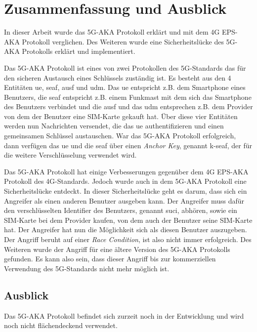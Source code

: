\chapter{Zusammenfassung und Ausblick}
\label{chap:6}

In dieser Arbeit wurde das 5G-AKA Protokoll erklärt und mit dem 4G EPS-AKA Protokoll verglichen.
Des Weiteren wurde eine Sicherheitslücke des 5G-AKA Protokolls erklärt und implementiert.

Das 5G-AKA Protokoll ist eines von zwei Protokollen des 5G-Standards das für den sicheren Austausch eines Schlüssels zuständig ist.
Es besteht aus den 4 Entitäten \gls{ue}, \gls{seaf}, \gls{ausf} und \gls{udm}.
Das \gls{ue} entspricht z.B. dem Smartphone eines Benutzers, die \gls{seaf} entspricht z.B. einem Funkmast mit dem sich das Smartphone des Benutzers verbindet und die \gls{ausf} und das \gls{udm} entsprechen z.B. dem Provider von dem der Benutzer eine SIM-Karte gekauft hat.
Über diese vier Entitäten werden nun Nachrichten versendet, die das \gls{ue} authentifizieren und einen gemeinsamen Schlüssel austauschen.
War das 5G-AKA Protokoll erfolgreich, dann verfügen das \gls{ue} und die \gls{seaf} über einen \textit{Anchor Key}, genannt \gls{k-seaf}, der für die weitere Verschlüsselung verwendet wird.

Das 5G-AKA Protokoll hat einige Verbesserungen gegenüber dem 4G EPS-AKA Protokoll des 4G-Standards.
Jedoch wurde auch in dem 5G-AKA Protokoll eine Sicherheitslücke entdeckt.
In dieser Sicherheitslücke geht es darum, dass sich ein Angreifer als einen anderen Benutzer ausgeben kann.
Der Angreifer muss dafür den verschlüsselten Identifier des Benutzers, genannt \gls{suci}, abhören, sowie ein SIM-Karte bei dem Provider kaufen, von dem auch der Benutzer seine SIM-Karte hat.
Der Angreifer hat nun die Möglichkeit sich als diesen Benutzer auszugeben.
Der Angriff beruht auf einer \textit{Race Condition}, ist also nicht immer erfolgreich.
Des Weiteren wurde der Angriff für eine ältere Version des 5G-AKA Protokolls gefunden.
Es kann also sein, dass dieser Angriff bis zur kommerziellen Verwendung des 5G-Standards nicht mehr möglich ist.


\section*{Ausblick}
Das 5G-AKA Protokoll befindet sich zurzeit noch in der Entwicklung und wird noch nicht flächendeckend verwendet.

